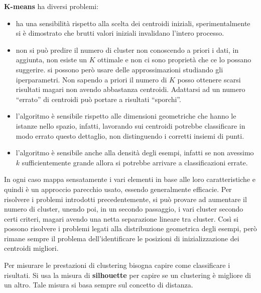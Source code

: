 \textbf{K-means} ha diversi problemi:
\begin{itemize}
    \item ha una sensibilità rispetto alla scelta dei centroidi iniziali,
          sperimentalmente si è dimostrato che brutti valori iniziali invalidano
          l'intero processo.
    \item non si può predire il numero di cluster non conoscendo a priori i dati,
          in aggiunta, non esiste un $K$ ottimale e non ci sono proprietà che ce
          lo possano suggerire. si possono però usare delle approssimazioni
          studiando gli iperparametri. Non sapendo a priori il numero di $K$ posso
          ottenere scarsi risultati magari non avendo abbastanza centroidi.
          Adattarsi ad un numero “errato” di centroidi può portare a risultati
          “sporchi”.
    \item l'algoritmo è sensibile rispetto alle dimensioni geometriche che hanno
          le istanze nello spazio, infatti, lavorando sui centroidi potrebbe
          classificare in modo errato questo dettaglio, non distinguendo i corretti
          insiemi di punti.
    \item l'algoritmo è sensibile anche alla densità degli esempi, infatti se non
          avessimo $k$ sufficientemente grande allora si potrebbe arrivare a
          classificazioni errate.
\end{itemize}

In ogni caso mappa sensatamente i vari elementi in base alle loro caratteristiche
e quindi è un approccio parecchio usato, essendo generalmente efficacie. Per risolvere
i problemi introdotti precedentemente, si può provare ad aumentare il numero di
cluster, unendo poi, in un secondo passaggio, i vari cluster secondo certi criteri,
magari avendo una netta separazione lineare tra cluster. Così si possono risolvere
i problemi legati alla distribuzione geometrica degli esempi, però rimane sempre
il problema dell'identificare le posizioni di inizializzazione dei centroidi migliori.

Per misurare le prestazioni di clustering bisogna capire come classificare i
risultati. Si usa la misura di \textbf{silhouette} per capire se un clustering è
migliore di un altro. Tale misura si basa sempre sul concetto di distanza.

